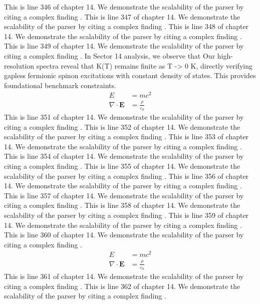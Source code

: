 This is line 346 of chapter 14. We demonstrate the scalability of the parser by citing a complex finding \cite{ref14_346}.
This is line 347 of chapter 14. We demonstrate the scalability of the parser by citing a complex finding \cite{ref14_347}.
This is line 348 of chapter 14. We demonstrate the scalability of the parser by citing a complex finding \cite{ref14_348}.
This is line 349 of chapter 14. We demonstrate the scalability of the parser by citing a complex finding \cite{ref14_349}.
In Sector 14 analysis, we observe that Our high-resolution spectra reveal that K(T) remains finite as T -> 0 K, directly verifying gapless fermionic spinon excitations with constant density of states. This provides foundational benchmark constraints.
\begin{align*}
  E &= mc^2 \\
  \nabla \cdot \mathbf{E} &= \frac{\rho}{\varepsilon_0}
\end{align*}
This is line 351 of chapter 14. We demonstrate the scalability of the parser by citing a complex finding \cite{ref14_351}.
This is line 352 of chapter 14. We demonstrate the scalability of the parser by citing a complex finding \cite{ref14_352}.
This is line 353 of chapter 14. We demonstrate the scalability of the parser by citing a complex finding \cite{ref14_353}.
This is line 354 of chapter 14. We demonstrate the scalability of the parser by citing a complex finding \cite{ref14_354}.
This is line 355 of chapter 14. We demonstrate the scalability of the parser by citing a complex finding \cite{ref14_355}.
This is line 356 of chapter 14. We demonstrate the scalability of the parser by citing a complex finding \cite{ref14_356}.
This is line 357 of chapter 14. We demonstrate the scalability of the parser by citing a complex finding \cite{ref14_357}.
This is line 358 of chapter 14. We demonstrate the scalability of the parser by citing a complex finding \cite{ref14_358}.
This is line 359 of chapter 14. We demonstrate the scalability of the parser by citing a complex finding \cite{ref14_359}.
This is line 360 of chapter 14. We demonstrate the scalability of the parser by citing a complex finding \cite{ref14_360}.
\begin{align*}
  E &= mc^2 \\
  \nabla \cdot \mathbf{E} &= \frac{\rho}{\varepsilon_0}
\end{align*}
This is line 361 of chapter 14. We demonstrate the scalability of the parser by citing a complex finding \cite{ref14_361}.
This is line 362 of chapter 14. We demonstrate the scalability of the parser by citing a complex finding \cite{ref14_362}.
